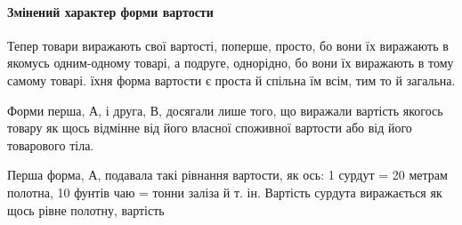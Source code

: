 \paragraph{Змінений характер форми вартости}

Тепер товари виражають свої вартості, поперше, просто, бо
вони їх виражають в яко\-мусь од\-ним-од\-но\-му товарі, а подруге,
однорідно, бо вони їх виражають в тому самому товарі. їхня форма
вартости є проста й спільна їм всім, тим то й загальна.

Форми перша, А, і друга, В, досягали лише того, що виражали
вартість якогось товару як щось відмінне від його власної
споживної вартости або від його товарового тіла.

Перша форма, А, подавала такі рівнання вартости, як ось: 1 сурдут
= 20 метрам полотна, 10 фунтів чаю =  тонни заліза й т. ін.
Вартість сурдута виражається як щось рівне полотну, вартість
\parbreak{}  %
